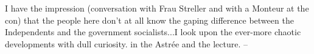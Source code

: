 I have the impression (conversation with Frau Streller and with a Monteur at the con) that the people here don't at all know the gaping difference between the Independents and the government socialists...I look upon the ever-more chaotic developments with dull curiosity.  in the Astrée and the lecture. --

\missing


